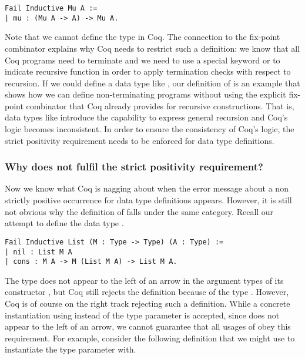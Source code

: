 \begin{verbatim}
Fail Inductive Mu A :=
| mu : (Mu A -> A) -> Mu A.
\end{verbatim}

Note that we cannot define the type  in Coq.
The connection to the fix\--point combinator explains why Coq needs to restrict such a definition: we know that all Coq programs need to terminate and we need to use a special keyword  or  to indicate recursive function in order to apply termination checks with respect to recursion.
If we could define a data type like , our definition of  is an example that shows how we can define non\--terminating programs without using the explicit fix\--point combinator that Coq already provides for recursive constructions.
That is, data types like  introduce the capability to express general recursion and Coq's logic becomes inconsistent.
In order to ensure the consistency of Coq's logic, the strict positivity requirement needs to be enforced for data type definitions.

\subsubsection{Why does  not fulfil the strict positivity requirement?}

Now we know what Coq is nagging about when the error message about a non strictly positive occurrence for data type definitions appears.
However, it is still not obvious why the definition of  falls under the same category.
Recall our attempt to define the data type .

\begin{verbatim}
Fail Inductive List (M : Type -> Type) (A : Type) :=
| nil : List M A
| cons : M A -> M (List M A) -> List M A.
\end{verbatim}

The type  does not appear to the left of an arrow in the argument types of its constructor , but Coq still rejects the definition because of the type .
However, Coq is of course on the right track rejecting such a definition.
While a concrete instantiation using  instead of the type parameter  is accepted, since  does not appear to the left of an arrow, we cannot guarantee that all usages of  obey this requirement.
For example, consider the following definition that we might use to instantiate the type parameter with.

